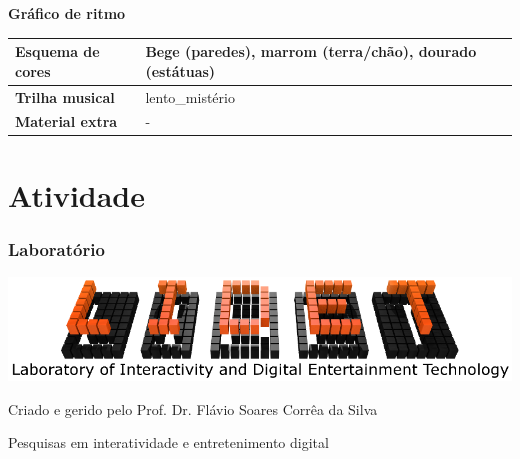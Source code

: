 \expandafter\documentclass\expandafter[table, usenames, svgnames, dvipsnames, \classopts]{beamer}
\begin{document}
\begin{frame}{\textbf{Gráfico de ritmo}}
\begin{table}[h]
\begin{tabular}{l p{6cm}}
    \textbf{Esquema de cores}        & Bege (paredes), marrom (terra/chão), dourado (estátuas)                                                             \\ \hline
    \textbf{Trilha musical}          & lento\_mistério                                                                                                     \\ \hline
    \textbf{Material extra}          & -                                                                                                                   \\ \hline
    \end{tabular}
    \end{table}
\end{frame}


\section{Atividade}

\begin{frame}
	\frametitle{\textbf{Laboratório}}
	
	\begin{center}
		\includegraphics[height=0.2\paperheight]{lidet-logo}
	\end{center}
	\begin{outline}
		\1 Criado e gerido pelo Prof. Dr. Flávio Soares Corrêa da Silva
		
		\1 Pesquisas em interatividade e entretenimento digital
	\end{outline}	

\end{frame}
\end{document}
